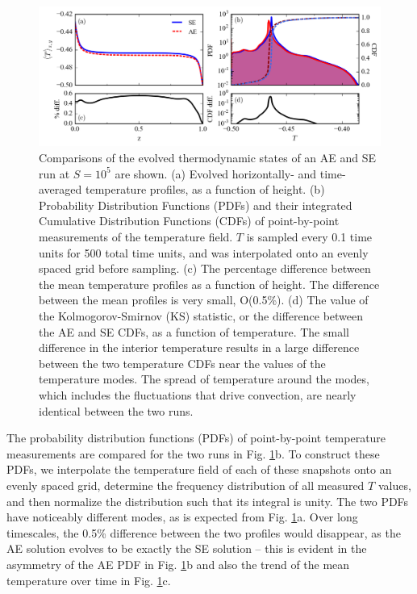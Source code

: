 \documentclass[aps, pre, onecolumn, nofootinbib, notitlepage, groupedaddress, amsfonts, amssymb, amsmath, longbibliography]{revtex4-1}
\begin{document}
\begin{figure}[b]
\includegraphics[width=\textwidth]{./figs/temp_comparison.png}
\caption{Comparisons of the evolved thermodynamic states of an AE and SE run
at $S = 10^{5}$ are shown.  (a) Evolved horizontally- and time-averaged 
temperature profiles, as a function of height.
(b) Probability Distribution Functions (PDFs) and their integrated
Cumulative Distribution Functions (CDFs)
of point-by-point measurements of the temperature field.
$T$ is sampled every 0.1 time units for 500 total time units,
and was interpolated onto an evenly spaced grid before sampling.
(c) The percentage difference between the mean temperature profiles as a function of height.
The difference between the mean profiles is very small, O(0.5\%).
(d) The value of the Kolmogorov-Smirnov (KS) statistic, or the difference between
the AE and SE CDFs, as a function of temperature.
The small
difference in the interior temperature 
results in a large difference between the two temperature CDFs near the values
of the temperature modes.  The spread of temperature around the modes, which includes the 
fluctuations that drive convection, are nearly identical between the two runs.
\label{fig:temp_comparison} }
\end{figure}

The probability distribution functions (PDFs)
of point-by-point temperature measurements are compared for the two runs
in Fig. \ref{fig:temp_comparison}b. To construct these PDFs, 
we interpolate the temperature field
of each of these snapshots onto an evenly spaced grid, determine the
frequency distribution of all measured $T$ values, and then normalize the
distribution such that its integral is unity.  The two PDFs have noticeably
different modes, as is expected from Fig. \ref{fig:temp_comparison}a. 
Over long timescales, the 0.5\% difference between the two profiles would
disappear, as the AE solution evolves to be exactly the SE solution -- this
is evident in the asymmetry of the AE PDF in Fig. \ref{fig:temp_comparison}b and also
the trend of the mean temperature over time in Fig. \ref{fig:temp_comparison}c.
\end{document}
